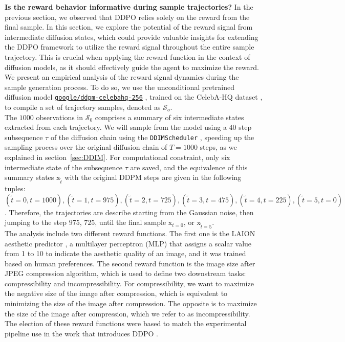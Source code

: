 \textbf{Is the reward behavior informative during sample trajectories?} 
In the previous section, we observed that DDPO relies solely on the reward from the final sample. In this section, we explore the potential of the reward signal from intermediate diffusion states, which could provide valuable insights for extending the DDPO framework to utilize the reward signal throughout the entire sample trajectory. This is crucial when applying the reward function in the context of diffusion models, as it should effectively guide the agent to maximize the reward. We present an empirical analysis of the reward signal dynamics during the sample generation process. To do so, we use the unconditional pretrained diffusion model \href{https://huggingface.co/google/ddpm-celebahq-256}{\texttt{google/ddpm-celebahq-256}} \cite{ho2020denoising}, trained on the CelebA-HQ dataset \citep{karras2017progressive}, to compile a set of trajectory samples, denoted as $\mathcal{S}_o$. \\


\noindent The $1000$ observations in $\mathcal{S}_{0}$ comprises a summary of six intermediate states extracted from each trajectory. We will sample from the model using a $40$ step subsequence $\tau$ of the diffusion chain using the \texttt{DDIMScheduler} \cite{song2020denoising}, speeding up the sampling process over the original diffusion chain of $T=1000$ steps, as we explained in section~\ref{sec:DDIM}. For computational constraint, only six intermediate state of the subsequence $\tau$ are saved, and the equivalence of this summary states $\mathrm{x}_{\tilde{t}}$ with the original DDPM steps are given in the following tuples: $(\tilde{t}=0, t=1000), (\tilde{t}=1, t=975), (\tilde{t}=2, t=725), (\tilde{t}=3, t=475), (\tilde{t}=4, t=225), (\tilde{t}=5, t=0)$. Therefore, the trajectories are describe starting from the Gaussian noise, then jumping to the step $975$, $725$, until the final sample $\mathrm{x}_{t=0}$, or $\mathrm{x}_{\tilde{t}=5}$. \\


\noindent The analysis include two different reward functions. The first one is the LAION aesthetic predictor \cite{laion2022}, a multilayer perceptron (MLP) that assigns a scalar value from 1 to 10 to indicate the aesthetic quality of an image, and it was trained based on human preferences. The second reward function is the image size after JPEG compression algorithm, which is used to define two downstream tasks: compressibility and incompressibility. For compressibility, we want to maximize the negative size of the image after compression, which is equivalent to minimizing the size of the image after compression. The opposite is to maximize the size of the image after compression, which we refer to as incompressibility. The election of these reward functions were based to match the experimental pipeline use in the work that introduces DDPO \cite{black2023training}. \\

